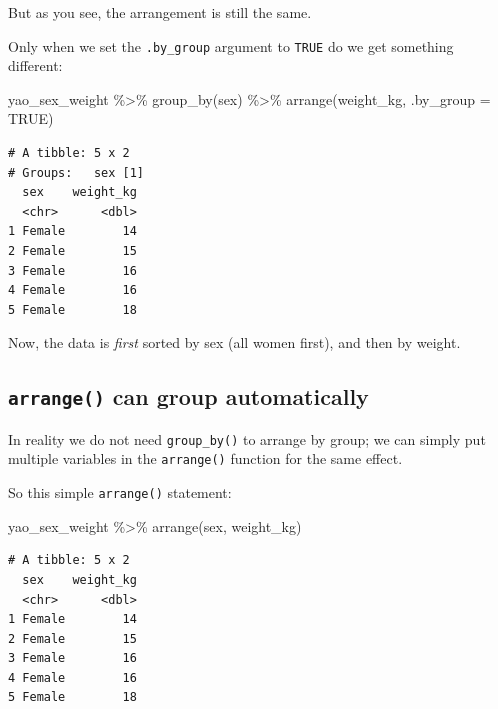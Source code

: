 \documentclass[
  letterpaper,
  DIV=11,
  numbers=noendperiod]{scrreprt}
\newenvironment{Shaded}{\begin{snugshade}}{\end{snugshade}}
\newcommand{\AttributeTok}[1]{\textcolor[rgb]{0.40,0.45,0.13}{#1}}
\newcommand{\ConstantTok}[1]{\textcolor[rgb]{0.56,0.35,0.01}{#1}}
\newcommand{\FunctionTok}[1]{\textcolor[rgb]{0.28,0.35,0.67}{#1}}
\newcommand{\NormalTok}[1]{\textcolor[rgb]{0.00,0.23,0.31}{#1}}
\newcommand{\SpecialCharTok}[1]{\textcolor[rgb]{0.37,0.37,0.37}{#1}}
\begin{document}
But as you see, the arrangement is still the same.

Only when we set the \texttt{.by\_group} argument to \texttt{TRUE} do we
get something different:

\begin{Shaded}
\begin{Highlighting}[]
\NormalTok{yao\_sex\_weight }\SpecialCharTok{\%\textgreater{}\%} 
  \FunctionTok{group\_by}\NormalTok{(sex) }\SpecialCharTok{\%\textgreater{}\%} 
  \FunctionTok{arrange}\NormalTok{(weight\_kg, }\AttributeTok{.by\_group =} \ConstantTok{TRUE}\NormalTok{)}
\end{Highlighting}
\end{Shaded}

\begin{verbatim}
# A tibble: 5 x 2
# Groups:   sex [1]
  sex    weight_kg
  <chr>      <dbl>
1 Female        14
2 Female        15
3 Female        16
4 Female        16
5 Female        18
\end{verbatim}

Now, the data is \emph{first} sorted by sex (all women first), and then
by weight.

\hypertarget{arrange-can-group-automatically}{%
\subsection*{\texorpdfstring{\texttt{arrange()} can group
automatically}{arrange() can group automatically}}\label{arrange-can-group-automatically}}

In reality we do not need \texttt{group\_by()} to arrange by group; we
can simply put multiple variables in the \texttt{arrange()} function for
the same effect.

So this simple \texttt{arrange()} statement:

\begin{Shaded}
\begin{Highlighting}[]
\NormalTok{yao\_sex\_weight }\SpecialCharTok{\%\textgreater{}\%} 
  \FunctionTok{arrange}\NormalTok{(sex, weight\_kg)}
\end{Highlighting}
\end{Shaded}

\begin{verbatim}
# A tibble: 5 x 2
  sex    weight_kg
  <chr>      <dbl>
1 Female        14
2 Female        15
3 Female        16
4 Female        16
5 Female        18
\end{verbatim}
\end{document}
